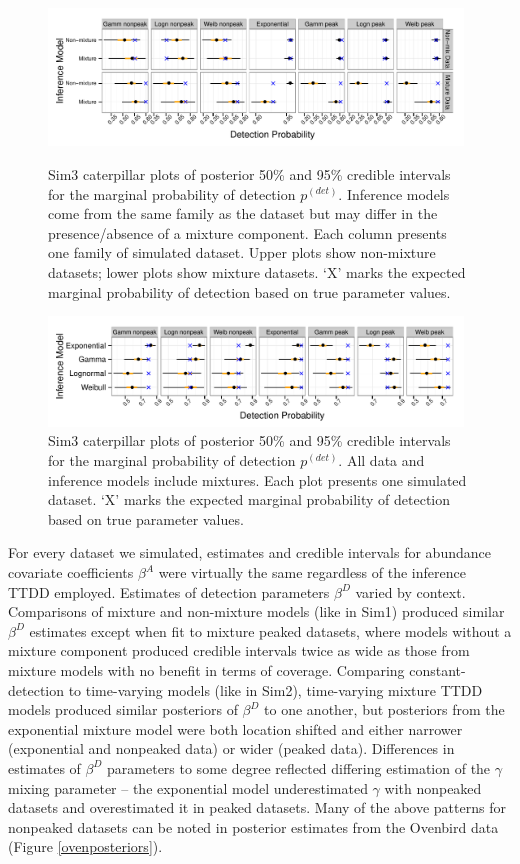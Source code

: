 \documentclass[useAMS,usenatbib,referee,12pt]{article}
\begin{document}
\begin{figure}[h!]\centering
\includegraphics[width=0.98\textwidth]{Sims/SimFull/pdet_cater_correct.pdf}
\caption{\label{pdet_cater_correct} Sim3 caterpillar plots of posterior 50\% and 95\% credible intervals for the marginal probability of detection $p^{(det)}$.  
Inference models come from the same family as the dataset but may differ in the presence/absence of a mixture component.  
Each column presents one family of simulated dataset.  
Upper plots show non-mixture datasets; lower plots show mixture datasets.  
`X' marks the expected marginal probability of detection based on true parameter values.}
\includegraphics[width=0.98\textwidth]{Sims/SimFull/pdet_cater_family.pdf}
\caption{\label{pdet_cater_family}  Sim3 caterpillar plots of posterior 50\% and 95\% credible intervals for the marginal probability of detection $p^{(det)}$. All data and inference models include mixtures.  
Each plot presents one simulated dataset.  
`X' marks the expected marginal probability of detection based on true parameter values.}
\end{figure}

For every dataset we simulated, estimates and credible intervals for abundance covariate coefficients $\beta^A$ were virtually the same regardless of the inference TTDD employed.  
Estimates of detection parameters $\beta^D$ varied by context.  
Comparisons of mixture and non-mixture models (like in Sim1) produced similar $\beta^D$ estimates except when fit to mixture peaked datasets, where models without a mixture component produced credible intervals twice as wide as those from mixture models with no benefit in terms of coverage.
Comparing constant-detection to time-varying models (like in Sim2), time-varying mixture TTDD models produced similar posteriors of $\beta^D$ to one another, but posteriors from the exponential mixture model were both location shifted and either narrower (exponential and nonpeaked data) or wider (peaked data).
Differences in estimates of $\beta^D$ parameters to some degree reflected differing estimation of the $\gamma$ mixing parameter -- the exponential model underestimated $\gamma$ with nonpeaked datasets and overestimated it in peaked datasets.
Many of the above patterns for nonpeaked datasets can be noted in posterior estimates from the Ovenbird data (Figure \ref{ovenposteriors}).
\end{document}
